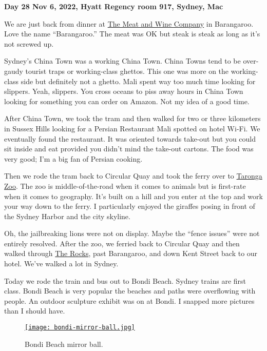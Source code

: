 \textbf{Day 28 Nov 6, 2022, Hyatt Regency room 917, Sydney, Mac}

We are just back from dinner at
\href{https://themeatandwineco.com/sydney-restaurants/barangaroo/}{The
Meat and Wine Company} in Barangaroo. Love the name ``Barangaroo.'' The
meat was OK but steak is steak as long as it's not screwed up.

Sydney's China Town was a working China Town. China Towns tend to be
over-gaudy tourist traps or working-class ghettos. This one was more on
the working-class side but definitely not a ghetto. Mali spent way too
much time looking for slippers. Yeah, slippers. You cross oceans to piss
away hours in China Town looking for something you can order on Amazon.
Not my idea of a good time.

After China Town, we took the tram and then walked for two or three
kilometers in Sussex Hills looking for a Persian Restaurant Mali spotted
on hotel Wi-Fi. We eventually found the restaurant. It was oriented
towards take-out but you could sit inside and eat provided you didn't
mind the take-out cartons. The food was very good; I'm a big fan of
Persian cooking.

Then we rode the tram back to Circular Quay and took the ferry over to
\href{https://taronga.org.au/sydney-zoo}{Taronga Zoo}. The zoo is
middle-of-the-road when it comes to animals but is first-rate when it
comes to geography. It's built on a hill and you enter at the top and
work your way down to the ferry. I particularly enjoyed the giraffes
posing in front of the Sydney Harbor and the city skyline.

Oh, the jailbreaking lions were not on display. Maybe the ``fence
issues'' were not entirely resolved. After the zoo, we ferried back to
Circular Quay and then walked through
\href{https://www.sydney.com/destinations/sydney/sydney-city/the-rocks}{The
Rocks}, past Barangaroo, and down Kent Street back to our hotel. We've
walked a lot in Sydney.

Today we rode the train and bus out to Bondi Beach. Sydney trains are
first class. Bondi Beach is very popular the beaches and paths were
overflowing with people. An outdoor sculpture exhibit was on at Bondi. I
snapped more pictures than I should have.

\captionsetup[figure]{labelformat=empty}
\begin{figure}[htbp]
\centering
\href{https://conceptcontrol.smugmug.com/Trips/Overseas/Australia-New-Zealand-2022/i-DtsNvCQ/A}{\texttt{[image: bondi-mirror-ball.jpg]}}
\caption{Bondi Beach mirror ball.}
\label{fig:7627x3}
\end{figure}

